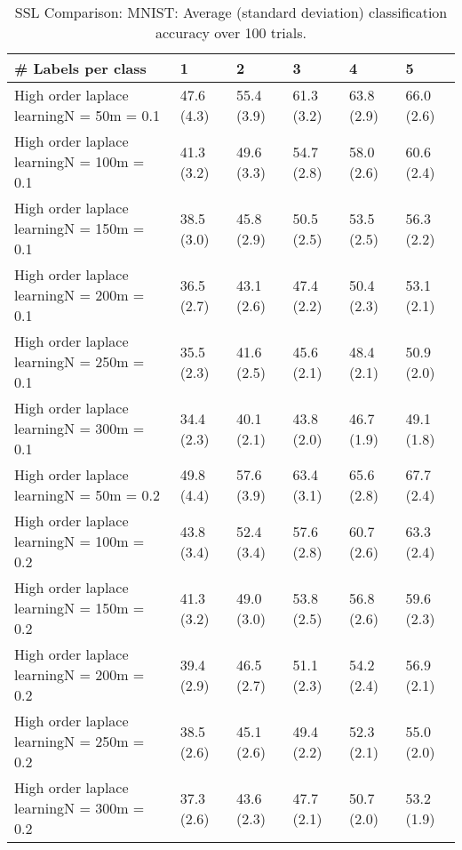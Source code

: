 \documentclass{article}
\begin{document}
\begin{table*}[t!]
\vspace{-3mm}
\caption{SSL Comparison: MNIST: Average (standard deviation) classification accuracy over 100 trials.}
\vspace{-3mm}
\label{tab:SSL Comparison: MNIST}
\vskip 0.15in
\begin{center}
\begin{small}
\begin{sc}
\begin{tabular}{llllll}
\toprule
\# Labels per class&\textbf{1}&\textbf{2}&\textbf{3}&\textbf{4}&\textbf{5}\\
\midrule
High order laplace learningN = 50m = 0.1&47.6 (4.3)      &55.4 (3.9)      &61.3 (3.2)      &63.8 (2.9)      &66.0 (2.6)      \\
High order laplace learningN = 100m = 0.1&41.3 (3.2)      &49.6 (3.3)      &54.7 (2.8)      &58.0 (2.6)      &60.6 (2.4)      \\
High order laplace learningN = 150m = 0.1&38.5 (3.0)      &45.8 (2.9)      &50.5 (2.5)      &53.5 (2.5)      &56.3 (2.2)      \\
High order laplace learningN = 200m = 0.1&36.5 (2.7)      &43.1 (2.6)      &47.4 (2.2)      &50.4 (2.3)      &53.1 (2.1)      \\
High order laplace learningN = 250m = 0.1&35.5 (2.3)      &41.6 (2.5)      &45.6 (2.1)      &48.4 (2.1)      &50.9 (2.0)      \\
High order laplace learningN = 300m = 0.1&34.4 (2.3)      &40.1 (2.1)      &43.8 (2.0)      &46.7 (1.9)      &49.1 (1.8)      \\
High order laplace learningN = 50m = 0.2&49.8 (4.4)      &57.6 (3.9)      &63.4 (3.1)      &65.6 (2.8)      &67.7 (2.4)      \\
High order laplace learningN = 100m = 0.2&43.8 (3.4)      &52.4 (3.4)      &57.6 (2.8)      &60.7 (2.6)      &63.3 (2.4)      \\
High order laplace learningN = 150m = 0.2&41.3 (3.2)      &49.0 (3.0)      &53.8 (2.5)      &56.8 (2.6)      &59.6 (2.3)      \\
High order laplace learningN = 200m = 0.2&39.4 (2.9)      &46.5 (2.7)      &51.1 (2.3)      &54.2 (2.4)      &56.9 (2.1)      \\
High order laplace learningN = 250m = 0.2&38.5 (2.6)      &45.1 (2.6)      &49.4 (2.2)      &52.3 (2.1)      &55.0 (2.0)      \\
High order laplace learningN = 300m = 0.2&37.3 (2.6)      &43.6 (2.3)      &47.7 (2.1)      &50.7 (2.0)      &53.2 (1.9)      \\

\end{tabular}
\end{sc}
\end{small}
\end{center}
\end{table*}
\end{document}

